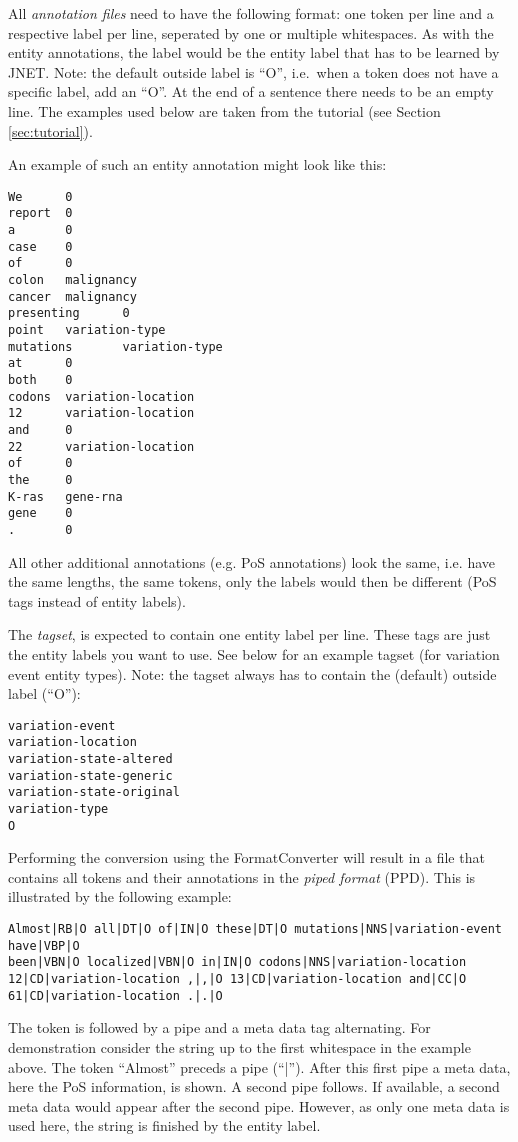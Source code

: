\documentclass[11pt,a4paper,halfparskip]{scrartcl}
\begin{document}
All \textit{annotation files} need to have the following format: one
token per line and a respective label per line, seperated by one or
multiple whitespaces. As with the entity annotations, the label would
be the entity label that has to be learned by JNET. Note: the default
outside label is ``O'', i.e.\ when a token does not have a specific
label, add an ``O''. At the end of a sentence there needs to be an
empty line. The examples used below are taken from the tutorial (see
Section \ref{sec:tutorial}).

An example of such an entity annotation might look like this:

\begin{verbatim}
We      0
report  0
a       0
case    0
of      0
colon   malignancy
cancer  malignancy
presenting      0
point   variation-type
mutations       variation-type
at      0
both    0
codons  variation-location
12      variation-location
and     0
22      variation-location
of      0
the     0
K-ras   gene-rna
gene    0
.       0
\end{verbatim}

All other additional annotations (e.g. PoS annotations) look the same,
i.e. have the same lengths, the same tokens, only the labels would
then be different (PoS tags instead of entity labels).

The \textit{tagset}, is expected to contain one entity label per line.
These tags are just the entity labels you want to use. See below for
an example tagset (for variation event entity types). Note: the tagset
always has to contain the (default) outside label (``O''):

\begin{verbatim}
variation-event
variation-location
variation-state-altered
variation-state-generic
variation-state-original
variation-type
O
\end{verbatim}

Performing the conversion using the FormatConverter will result in a
file that contains all tokens and their annotations in the
\textit{piped format} (PPD). This is illustrated by the following
example:

\begin{verbatim}
Almost|RB|O all|DT|O of|IN|O these|DT|O mutations|NNS|variation-event have|VBP|O
been|VBN|O localized|VBN|O in|IN|O codons|NNS|variation-location
12|CD|variation-location ,|,|O 13|CD|variation-location and|CC|O
61|CD|variation-location .|.|O
\end{verbatim}

The token is followed by a pipe and a meta data tag alternating. For
demonstration consider the string up to the first whitespace in the example
above. The token ``Almost'' preceds a pipe (``|''). After this first pipe a meta
data, here the PoS information, is shown. A second pipe follows. If available, a
second meta data would appear after the second pipe. However, as
only one meta data is used here, the string is finished by the entity label.
\end{document}
